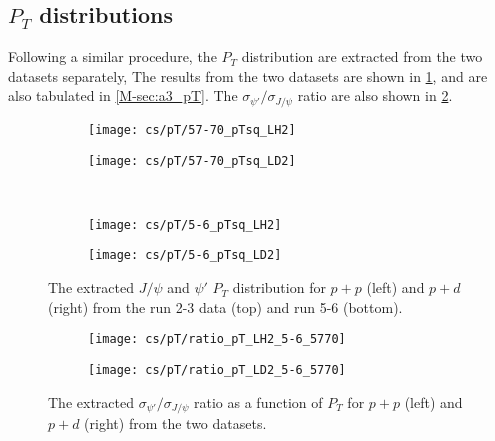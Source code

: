 \documentclass[../main.tex]{subfiles}
\begin{document}
\FloatBarrier
\subsection{\texorpdfstring{$P_T$}{P\_T} distributions}
Following a similar procedure, the $P_T$ distribution are extracted from the two datasets separately,
The results from the two datasets are shown in \cref{fig:pT_distribution}, and are also tabulated in
\cref{M-sec:a3_pT}.
The $\sigma_{\psi'}/\sigma_{J/\psi}$ ratio are also shown in \cref{fig:pT_ratio}.
\begin{figure}[h!]
	\centering
	\begin{subfigure}{0.45\linewidth}
		\texttt{[image: cs/pT/57-70\_pTsq\_LH2]}
	\end{subfigure}
	\begin{subfigure}{0.45\linewidth}
		\texttt{[image: cs/pT/57-70\_pTsq\_LD2]}
	\end{subfigure}
	\\
	\begin{subfigure}{0.45\linewidth}
		\texttt{[image: cs/pT/5-6\_pTsq\_LH2]}
	\end{subfigure}
	\begin{subfigure}{0.45\linewidth}
		\texttt{[image: cs/pT/5-6\_pTsq\_LD2]}
	\end{subfigure}
	\caption{The extracted $J/\psi$ and $\psi'$ $P_T$ distribution for $p+p$ (left)
		and $p+d$ (right) from the run 2-3 data (top) and run 5-6 (bottom).}
	\label{fig:pT_distribution}
\end{figure}
\begin{figure}[h!]
	\centering
	\begin{subfigure}{0.45\linewidth}
		\texttt{[image: cs/pT/ratio\_pT\_LH2\_5-6\_5770]}
	\end{subfigure}
	\begin{subfigure}{0.45\linewidth}
		\texttt{[image: cs/pT/ratio\_pT\_LD2\_5-6\_5770]}
	\end{subfigure}
	\caption{The extracted  $\sigma_{\psi'}/\sigma_{J/\psi}$ ratio as a function of $P_T$ for $p+p$ (left)
		and $p+d$ (right) from the two datasets.}
	\label{fig:pT_ratio}
\end{figure}
\end{document}
